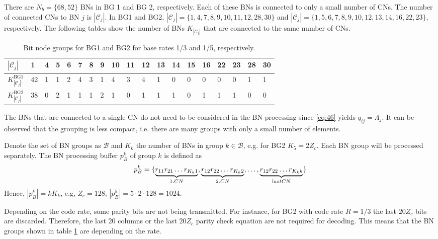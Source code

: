 \documentclass{article}
\def\Bcal{\mathcal{B}}
\def\Ccal{\mathcal{C}}
\def\Nb{{N_b}}
\def\Zc{{Z_c}}
\begin{document}
There are $\Nb = \{68,52\}$ BNs in BG 1 and BG 2, respectively. Each of these BNs is connected to only a small number of CNs. The number of connected CNs to BN $j$ is $|\Ccal_j|$. In BG1 and BG2, $|\Ccal_j|=\{1,4,7,8,9,10,11,12,28,30\}$ and $|\Ccal_j|=\{1,5,6,7,8,9,10,12,13,14,16,22,23\}$, respectively. The following tables show the number of BNs $K_{|\Ccal_j|}$ that are connected to the same number of CNs.

\begin{table}[ht]
  \centering
  \begin{tabular}{lllllllllllllllllll}
    \toprule
    $|\Ccal_j|$ & 1&4&5&6&7&8&9&10&11&12&13 & 14 & 15 & 16 & 22 & 23 &28&30 \\
    \midrule
    $K_{|\Ccal_j|}^\mathrm{BG1}$ & 42 & 1 & 1 & 2 & 4 & 3 & 1 & 4 & 3 & 4 & 1 & 0 & 0 & 0 & 0 & 0 & 1 & 1 \\
    $K_{|\Ccal_j|}^\mathrm{BG2}$ & 38 & 0 & 2 & 1 & 1 & 1 & 2 & 1 & 0 & 1 & 1 & 1 & 0 & 1 & 1 & 1 & 0 & 0\\
    \bottomrule
  \end{tabular}
  \caption{Bit node groups for BG1 and BG2 for base rates 1/3 and 1/5, respectively.}
  \label{tab:bitNodeGroups}
\end{table}

The BNs that are connected to a single CN do not need to be considered in the BN processing since \eqref{eq:46} yields $q_{ij} = \Lambda_j$. It can be observed that the grouping is less compact, i.e. there are many groups with only a small number of elements.

Denote the set of BN groups as $\Bcal$ and $K_k$ the number of BNs in group $k\in\Bcal$, e.g. for BG2 $K_5=2\Zc$. Each BN group will be processed separately. The BN processing buffer $p_B^k$ of group $k$ is defined as
\begin{equation}
  \label{eq:47}
  p_B^k = \{\underbrace{r_{11}r_{21}\dots r_{K_k 1}}_{\text 1. CN},\underbrace{r_{12}r_{22}\dots r_{K_k 2}}_{\text 2. CN},\dots,\underbrace{r_{12}r_{22}\dots r_{K_k k}}_{\text last CN}\}
\end{equation}
Hence, $|p_B^k| = kK_k$, e.g, $\Zc=128$, $|p_B^5| = 5\cdot 2\cdot 128 = 1024$.

Depending on the code rate, some parity bits are not being transmitted. For instance, for BG2 with code rate $R = 1/3$ the last $20\Zc$ bits are discarded. Therefore, the last 20 columns or the last $20\Zc$ parity check equation are not required for decoding. This means that the BN groups shown in table \ref{tab:bitNodeGroups} are depending on the rate.
\end{document}
